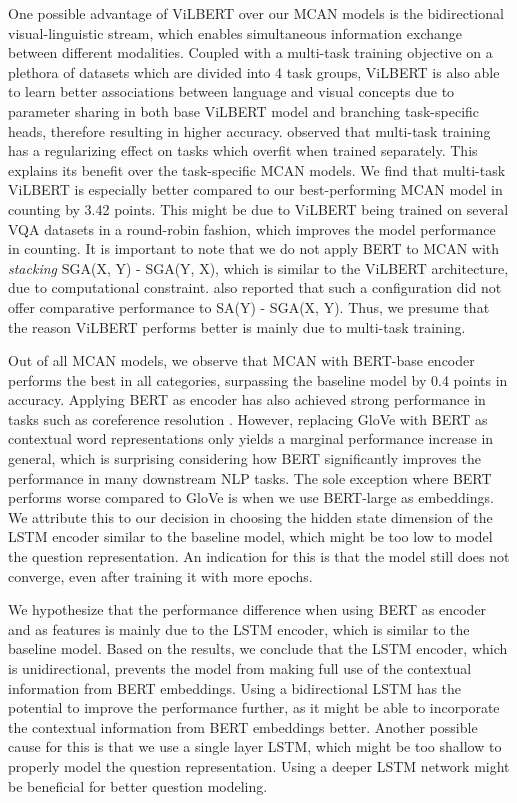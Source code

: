 \documentclass{article}
\begin{document}
One possible advantage of ViLBERT over our MCAN models is the bidirectional visual-linguistic stream, which enables simultaneous information exchange between different modalities. Coupled with a multi-task training objective on a plethora of datasets which are divided into 4 task groups, ViLBERT is also able to learn better associations between language and visual concepts due to parameter sharing in both base ViLBERT model and branching task-specific heads, therefore resulting in higher accuracy. \citet{lu2020multitask} observed that multi-task training has a regularizing effect on tasks which overfit when trained separately. This explains its benefit over the task-specific MCAN models. We find that multi-task ViLBERT is especially better compared to our best-performing MCAN model in counting by 3.42 points. This might be due to ViLBERT being trained on several VQA datasets in a round-robin fashion, which improves the model performance in counting. It is important to note that we do not apply BERT to MCAN with \textit{stacking} SGA(X, Y) - SGA(Y, X), which is similar to the ViLBERT architecture, due to computational constraint. \citet{yu2019mcan} also reported that such a configuration did not offer comparative performance to SA(Y) - SGA(X, Y). Thus, we presume that the reason ViLBERT performs better is mainly due to multi-task training.

Out of all MCAN models, we observe that MCAN with BERT-base encoder performs the best in all categories, surpassing the baseline model by 0.4 points in accuracy. Applying BERT as encoder has also achieved strong performance in tasks such as coreference resolution \citep{joshi-etal-2019-bert}. However, replacing GloVe with BERT as contextual word representations only yields a marginal performance increase in general, which is surprising considering how BERT significantly improves the performance in many downstream NLP tasks. The sole exception where BERT performs worse compared to GloVe is when we use BERT-large as embeddings. We attribute this to our decision in choosing the hidden state dimension of the LSTM encoder similar to the baseline model, which might be too low to model the question representation. An indication for this is that the model still does not converge, even after training it with more epochs. 

We hypothesize that the performance difference when using BERT as encoder and as features is mainly due to the LSTM encoder, which is similar to the baseline model. Based on the results, we conclude that the LSTM encoder, which is unidirectional, prevents the model from making full use of the contextual information from BERT embeddings. Using a bidirectional LSTM has the potential to improve the performance further, as it might be able to incorporate the contextual information from BERT embeddings better. Another possible cause for this is that we use a single layer LSTM, which might be too shallow to properly model the question representation. Using a deeper LSTM network might be beneficial for better question modeling.
\end{document}
